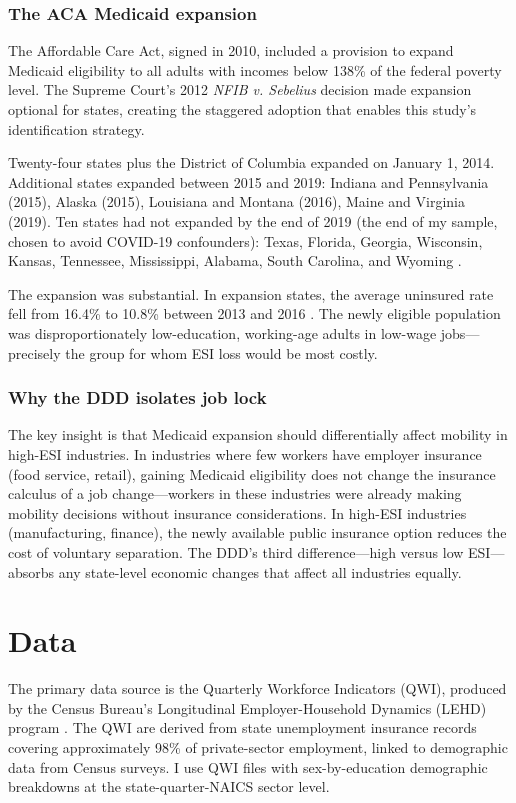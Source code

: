 \documentclass[12pt]{article}
\begin{document}
\subsubsection*{The ACA Medicaid expansion} The Affordable Care Act, signed in 2010, included a provision to expand Medicaid eligibility to all adults with incomes below 138\% of the federal poverty level. The Supreme Court's 2012 \textit{NFIB v. Sebelius} decision made expansion optional for states, creating the staggered adoption that enables this study's identification strategy.

Twenty-four states plus the District of Columbia expanded on January 1, 2014. Additional states expanded between 2015 and 2019: Indiana and Pennsylvania (2015), Alaska (2015), Louisiana and Montana (2016), Maine and Virginia (2019). Ten states had not expanded by the end of 2019 (the end of my sample, chosen to avoid COVID-19 confounders): Texas, Florida, Georgia, Wisconsin, Kansas, Tennessee, Mississippi, Alabama, South Carolina, and Wyoming \citep{sommers2012changes, simon2017impact}.

The expansion was substantial. In expansion states, the average uninsured rate fell from 16.4\% to 10.8\% between 2013 and 2016 \citep{buchmueller2016effect}. The newly eligible population was disproportionately low-education, working-age adults in low-wage jobs---precisely the group for whom ESI loss would be most costly.

\subsubsection*{Why the DDD isolates job lock} The key insight is that Medicaid expansion should differentially affect mobility in high-ESI industries. In industries where few workers have employer insurance (food service, retail), gaining Medicaid eligibility does not change the insurance calculus of a job change---workers in these industries were already making mobility decisions without insurance considerations. In high-ESI industries (manufacturing, finance), the newly available public insurance option reduces the cost of voluntary separation. The DDD's third difference---high versus low ESI---absorbs any state-level economic changes that affect all industries equally.

\section{Data}

The primary data source is the Quarterly Workforce Indicators (QWI), produced by the Census Bureau's Longitudinal Employer-Household Dynamics (LEHD) program \citep{abowd2009lehd}. The QWI are derived from state unemployment insurance records covering approximately 98\% of private-sector employment, linked to demographic data from Census surveys. I use QWI files with sex-by-education demographic breakdowns at the state-quarter-NAICS sector level.
\end{document}
